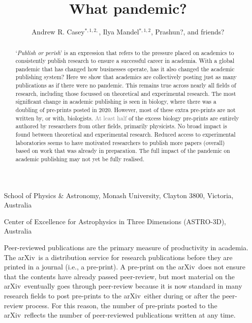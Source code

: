 \documentclass{nature}
\title{What pandemic?}
\author{Andrew R. Casey$^{\ast,1,2,}$,
        Ilya Mandel$^{\ast,1,2}$,
        Prashun?, 
        and friends?
}
\newcommand{\todo}[1]{\textcolor{gray}{#1}}
\newcommand{\arxiv}{arXiv}
\begin{document}
\maketitle

\begin{affiliations}
	\item School of Physics \& Astronomy, Monash University, Clayton 3800, Victoria, Australia
	\item Center of Excellence for Astrophysics in Three Dimensions (ASTRO-3D), Australia
\end{affiliations}

\begin{abstract}
	`\emph{Publish or perish}' is an expression that refers to the pressure placed on academics to consistently publish research to ensure a successful career in academia.
	With a global pandemic that has changed how businesses operate, has it also changed the academic publishing system?
	Here we show that academics are collectively posting just as many publications as if there were no pandemic. 
	This remains true across nearly all fields of research, including those focussed on theoretical and experimental research.
	The most significant change in academic publishing is seen in biology, where there was a doubling of pre-prints posted in 2020. 
	However, most of these extra pre-prints are not written by, or with, biologists.
	\todo{At least half} of the excess biology pre-prints are entirely authored by researchers from other fields, primarily physicists.
	No broad impact is found between theoretical and experimental research.
	Reduced access to experimental laboratories seems to have motivated researchers to publish more papers (overall) based on work that was already in preparation. The full impact of the pandemic on academic publishing may not yet be fully realised.	
\end{abstract}


Peer-reviewed publications are the primary measure of productivity in academia. The \arxiv\ is a distribution service for research publications before they are printed in a journal (i.e., a pre-print). A pre-print on the \arxiv\ does not ensure that the contents have already passed peer-review, but most material on the \arxiv\ eventually goes through peer-review because it is now standard in many research fields to post pre-prints to the \arxiv\ either during or after the peer-review process. For this reason, the number of pre-prints posted to the \arxiv\ reflects the number of peer-reviewed publications written at any time.
\end{document}
